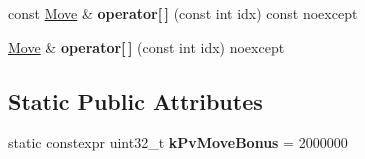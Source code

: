 \begin{DoxyCompactItemize}
\mbox{\label{classMoveList_a539ff8144c5e10279c0579e9ed891210}} 
const \mbox{\hyperlink{classMove}{Move}} \& {\bfseries operator\mbox{[}$\,$\mbox{]}} (const int idx) const noexcept
\item 
\mbox{\label{classMoveList_a50ecbac39d2fb550193a393260d0b6d4}} 
\mbox{\hyperlink{classMove}{Move}} \& {\bfseries operator\mbox{[}$\,$\mbox{]}} (const int idx) noexcept
\end{DoxyCompactItemize}
\subsection*{Static Public Attributes}
\begin{DoxyCompactItemize}
\item 
\mbox{\label{classMoveList_aec718c4a47eab2b41d8ea7f01b224ac4}} 
static constexpr uint32\+\_\+t {\bfseries k\+Pv\+Move\+Bonus} = 2000000
\end{DoxyCompactItemize}
